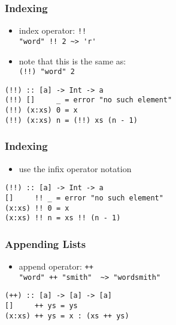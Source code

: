 \documentclass[dvipsnames]{beamer}
\theoremstyle{plain}
\begin{document}
\begin{frame}[fragile]
  \frametitle{Indexing}

  \begin{itemize}
    \item index operator: \lstinline|!!|\\
      \lstinline[style=exclamfix]|"word" !! 2 ~> 'r'|
    \item note that this is the same as:\\
      \lstinline[style=exclamfix]|(!!) "word" 2|
  \end{itemize}

  \begin{exampleblock}{}
    \begin{lstlisting}
(!!) :: [a] -> Int -> a
(!!) []     _ = error "no such element"
(!!) (x:xs) 0 = x
(!!) (x:xs) n = (!!) xs (n - 1)
    \end{lstlisting}
  \end{exampleblock}
\end{frame}

\begin{frame}[fragile]
  \frametitle{Indexing}

  \begin{itemize}
    \item use the infix operator notation
  \end{itemize}

  \begin{exampleblock}{}
    \begin{lstlisting}
(!!) :: [a] -> Int -> a
[]     !! _ = error "no such element"
(x:xs) !! 0 = x
(x:xs) !! n = xs !! (n - 1)
    \end{lstlisting}
  \end{exampleblock}
\end{frame}

\begin{frame}[fragile]
  \frametitle{Appending Lists}

  \begin{itemize}
    \item append operator: \lstinline|++|\\
      \lstinline[style=exclamfix]|"word" ++ "smith"  ~> "wordsmith"|
  \end{itemize}

  \begin{exampleblock}{}
    \begin{lstlisting}
(++) :: [a] -> [a] -> [a]
[]     ++ ys = ys
(x:xs) ++ ys = x : (xs ++ ys)
    \end{lstlisting}
  \end{exampleblock}
\end{frame}
\end{document}
